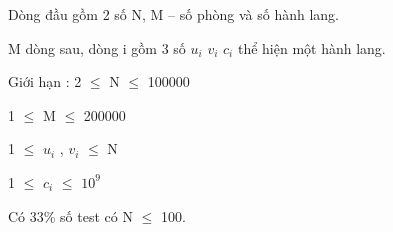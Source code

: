 Dòng đầu gồm 2 số N, M – số phòng và số hành lang.   


   M dòng sau, dòng i gồm 3 số $u_{i}$   $v_{i}$   $c_{i}$   thể hiện một hành lang.   


Giới hạn :   2  $\le$  N  $\le$  100000   


   1  $\le$  M  $\le$  200000   


   1  $\le$  $u_{i}$   , $v_{i}$    $\le$  N   


   1  $\le$  $c_{i}$    $\le$  $10^{9}$

   Có 33\% số test có N  $\le$  100.